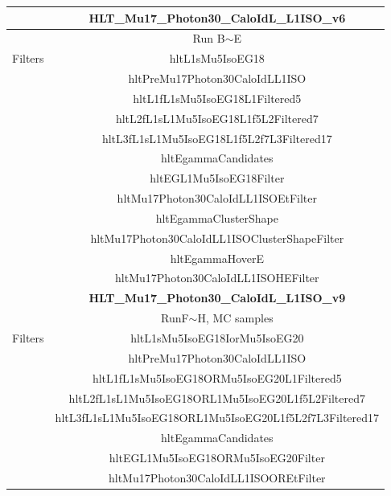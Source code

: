 		\begin{table}[p]
		\begin{center}
		\begin{tabular}{ |c|c| } 
		  
		\hline
		                  & \textbf{HLT\_Mu17\_Photon30\_CaloIdL\_L1ISO\_v6} \\
		\hline
		                  & Run B$\sim$E \\
		\hline
		 Filters  &  hltL1sMu5IsoEG18\\
		                  &  hltPreMu17Photon30CaloIdLL1ISO\\
		                  &  hltL1fL1sMu5IsoEG18L1Filtered5\\
		                  &  hltL2fL1sL1Mu5IsoEG18L1f5L2Filtered7\\
		                  &  \color{red} hltL3fL1sL1Mu5IsoEG18L1f5L2f7L3Filtered17\\
		                  &  hltEgammaCandidates\\
		                  &  hltEGL1Mu5IsoEG18Filter\\
		                  &  hltMu17Photon30CaloIdLL1ISOEtFilter\\
		                  &  hltEgammaClusterShape\\
		                  &  hltMu17Photon30CaloIdLL1ISOClusterShapeFilter\\
		                  &  hltEgammaHoverE\\
		                  &  \color{blue} hltMu17Photon30CaloIdLL1ISOHEFilter\\
		  \hline
		  \hline
		                  & \textbf{HLT\_Mu17\_Photon30\_CaloIdL\_L1ISO\_v9} \\
		\hline
		                  & RunF$\sim$H, MC samples\\
		\hline
		Filters  &  hltL1sMu5IsoEG18IorMu5IsoEG20\\
		                  &  hltPreMu17Photon30CaloIdLL1ISO\\
		                  &  hltL1fL1sMu5IsoEG18ORMu5IsoEG20L1Filtered5\\
		                  &  hltL2fL1sL1Mu5IsoEG18ORL1Mu5IsoEG20L1f5L2Filtered7\\
		                  &  \color{red} hltL3fL1sL1Mu5IsoEG18ORL1Mu5IsoEG20L1f5L2f7L3Filtered17\\
		                  &  hltEgammaCandidates\\
		                  &  hltEGL1Mu5IsoEG18ORMu5IsoEG20Filter\\
		                  &  hltMu17Photon30CaloIdLL1ISOOREtFilter\\

\end{tabular}
\end{center}
\end{table}
